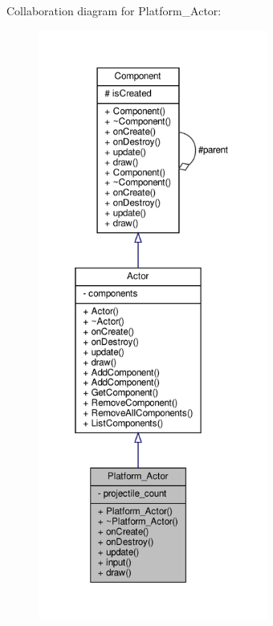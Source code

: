 Collaboration diagram for Platform\+\_\+\+Actor\+:
\nopagebreak
\begin{figure}[H]
\begin{center}
\leavevmode
\includegraphics[height=550pt]{classPlatform__Actor__coll__graph}
\end{center}
\end{figure}

